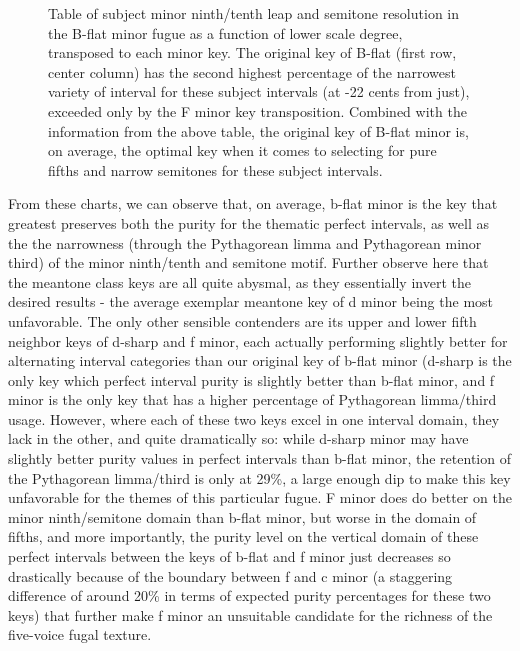 \begin{figure}[H]
\vspace{1.5em}
    \centering
    \caption[Table of subject minor ninth/tenth leap and semitone resolution in the B-flat minor fugue as a function of lower scale degree, transposed to each minor key. ]{Table of subject minor ninth/tenth leap and semitone resolution in the B-flat minor fugue as a function of lower scale degree, transposed to each minor key. The original key of B-flat (first row, center column) has the second highest percentage of the narrowest variety of interval for these subject intervals (at -22 cents from just), exceeded only by the F minor key transposition. Combined with the information from the above table, the original key of B-flat minor is, on average, the optimal key when it comes to selecting for pure fifths and narrow semitones for these subject intervals.}
\end{figure}    From these charts, we can observe that, on average, b-flat minor is the
key that greatest preserves both the purity for the thematic perfect
intervals, as well as the the narrowness (through the Pythagorean limma
and Pythagorean minor third) of the minor ninth/tenth and semitone
motif. Further observe here that the meantone class keys are all quite
abysmal, as they essentially invert the desired results - the average
exemplar meantone key of d minor being the most unfavorable. The only
other sensible contenders are its upper and lower fifth neighbor keys of
d-sharp and f minor, each actually performing slightly better for
alternating interval categories than our original key of b-flat minor
(d-sharp is the only key which perfect interval purity is slightly
better than b-flat minor, and f minor is the only key that has a higher
percentage of Pythagorean limma/third usage. However, where each of
these two keys excel in one interval domain, they lack in the other, and
quite dramatically so: while d-sharp minor may have slightly better
purity values in perfect intervals than b-flat minor, the retention of
the Pythagorean limma/third is only at 29\%, a large enough dip to make
this key unfavorable for the themes of this particular fugue. F minor
does do better on the minor ninth/semitone domain than b-flat minor, but
worse in the domain of fifths, and more importantly, the purity level on
the vertical domain of these perfect intervals between the keys of
b-flat and f minor just decreases so drastically because of the boundary
between f and c minor (a staggering difference of around 20\% in terms
of expected purity percentages for these two keys) that further make f
minor an unsuitable candidate for the richness of the five-voice fugal
texture.

